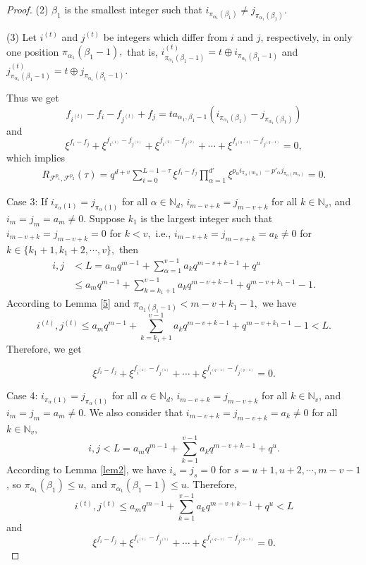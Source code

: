 \documentclass[11pt]{article}
\newcommand{\2} {$2$-to-$1$}
\begin{document}
\begin{proof}
 (2) $ \beta_1 $ is the smallest integer such that $ i_{\pi_{\alpha_{1}}(\beta_{1})}\neq j_{\pi_{\alpha_{1}}(\beta_{1})} $.

(3) Let $ i^{(t)} $ and $ j^{(t)} $ be integers which differ from $ i $ and $ j $, respectively, in only one position $ \pi_{\alpha_{1}}(\beta_{1}-1), $ that is, $ i^{(t)}_{\pi_{\alpha_{1}}(\beta_{1}-1)}=t\oplus i_{\pi_{\alpha_{1}}(\beta_{1}-1)} $ and $ j^{(t)}_{\pi_{\alpha_{1}}(\beta_{1}-1)}=t\oplus j_{\pi_{\alpha_{1}}(\beta_{1}-1)} $.
	
	Thus we get
	$$ f_{i^{(t)}}-f_i-f_{j^{(t)}}+f_j=ta_{\alpha_1,\beta_{1}-1}\left( i_{\pi_{\alpha_1}(\beta_{1})}- j_{\pi_{\alpha_1}(\beta_{1})}\right)  $$ and
	$$ \xi^{f_i-f_j}+\xi^{f_{i^{(1)}}-f_{j^{(1)}}}+\xi^{f_{i^{(2)}}-f_{j^{(2)}}}+\cdots+\xi^{f_{i^{(q-1)}}-f_{j^{(q-1)}}}=0,$$
	which implies   \begin{align*}
		R_{\mathcal{F}^{p_1},\mathcal{F}^{p_2}}(\tau)=q^{d+v}\sum_{i=0}^{L-1-\tau}\xi^{f_i-f_j}\prod_{\alpha=1}^{d'}\xi^{ p_{\alpha}i_{\pi_{\alpha}(m_{\alpha})}- p'_{\alpha}j_{\pi_{\alpha}(m_{\alpha})} }=0.
	\end{align*}
	
	Case 3: If $i_{\pi_{\alpha}(1)}= j_{\pi_{\alpha}(1)}$ for all  $\alpha \in \mathbb{N}_{d}$, $i_{m-v+k}= j_{m-v+k}$ for all $k \in \mathbb{N}_{v}$, and $ i_m=j_m=a_m\neq 0. $ Suppose $k_1$ is the largest integer such that $i_{m-v+k}=j_{m-v+k}=0$ for $k <v,$ i.e., $i_{m-v+k}=j_{m-v+k}=a_k\neq 0$ for $ k\in \{k_1+1,k_1+2,\cdots,v\}, $ then
	\begin{align*}
		i,j&<L=a_mq^{m-1}+\sum^{v-1}_{\alpha=1}a_{k}q^{m-v+k-1} +q^{u}\\
		&\leq a_mq^{m-1} +\sum^{v-1}_{k=k_1+1}a_{k}q^{m-v+k-1}+q^{m-v+k_1-1}-1.
	\end{align*}
	According to Lemma \ref{5}  and $ \pi_{\alpha_{1}(\beta_{1}-1)}<{m-v+k_1-1}, $ we have
	$$i^{(t)},j^{(t)}\leq a_mq^{m-1} +\sum^{v-1}_{k=k_1+1}a_{k}q^{m-v+k-1}+q^{m-v+k_1-1}-1< L.$$ Therefore, we get
	
	$$\xi^{f_{i}-f_{j}}+\xi^{f_{i^{(1)}}-f_{j^{(1)}}}+\cdots+\xi^{f_{i^{(q-1)}}-f_{j^{(q-1)}}}=0.$$
	
	
	Case 4: $i_{\pi_{\alpha}(1)}= j_{\pi_{\alpha}(1)}$ for all  $\alpha \in \mathbb{N}_d$, $i_{m-v+k}= j_{m-v+k}$ for all $k\in \mathbb{N}_{v}$, and $ i_m=j_m=a_m\neq 0. $ We also consider that $i_{m-v+k}=j_{m-v+k}=a_k\neq 0 $ for all $k\in \mathbb{N}_{v},$
	$$i,j<L=a_{m}q^{m-1}+\sum^{v-1}_{k=1}a_{k}q^{m-v+k-1}+q^{u}.$$ According to Lemma \ref{lem2}, we have $i_s=j_s=0$ for $s=u+1, u+2, \cdots, m-v-1$, so $\pi_{\alpha_{1}}(\beta_{1})\leq u, $ and $\pi_{\alpha_{1}}(\beta_{1}-1)\leq u. $
	  Therefore,
	$$i^{(t)},j^{(t)}\leq a_{m}q^{m-1}+\sum^{v-1}_{k=1}a_{k}q^{m-v+k-1}+q^{u}< L$$ and
	$$\xi^{f_{i}-f_{j}}+\xi^{f_{i^{(1)}}-f_{j^{(1)}}}+\cdots+\xi^{f_{i^{(q-1)}}-f_{j^{(q-1)}}}=0.$$
	

\end{proof}
\end{document}
